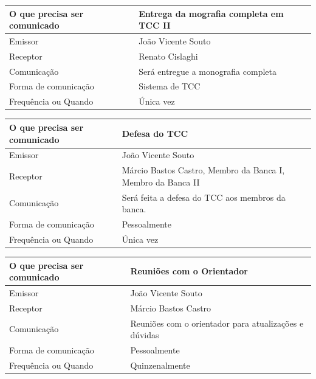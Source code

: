 \documentclass[
  12pt,       %
  openright,      %
  twoside,      %
  a4paper,      %
  english,      %
  brazil,       %
  ]{abntex2}
\begin{document}
\begin{center}
\begin{tabular}{|l|p{9cm}|}
\hline
    O que precisa ser comunicado & Entrega da mografia completa em TCC II \\ \hline
    Emissor & João Vicente Souto \\ \hline
    Receptor & Renato Cislaghi \\ \hline
    Comunicação & Será entregue a monografia completa \\ \hline
    Forma de comunicação & Sistema de TCC \\ \hline
    Frequência ou Quando & Única vez \\ \hline
\end{tabular}
\end{center}

\begin{center}
\begin{tabular}{|l|p{9cm}|}
\hline
    O que precisa ser comunicado & Defesa do TCC \\ \hline
    Emissor & João Vicente Souto \\ \hline
    Receptor & Márcio Bastos Castro, Membro da Banca I, Membro da Banca II\\ \hline
    Comunicação & Será feita a defesa do TCC aos membros da banca.  \\ \hline
    Forma de comunicação & Pessoalmente \\ \hline
    Frequência ou Quando & Única vez \\ \hline
\end{tabular}
\end{center}

\begin{center}
\begin{tabular}{|l|p{9cm}|}
\hline
    O que precisa ser comunicado & Reuniões com o Orientador \\ \hline
    Emissor & João Vicente Souto \\ \hline
    Receptor & Márcio Bastos Castro \\ \hline
    Comunicação & Reuniões com o orientador para atualizações e dúvidas \\ \hline
    Forma de comunicação & Pessoalmente \\ \hline
    Frequência ou Quando & Quinzenalmente \\ \hline
\end{tabular}
\end{center}
\end{document}
